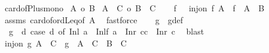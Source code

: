 \begin{isabellebody}
\ card{\isacharunderscore}{\kern0pt}of{\isacharunderscore}{\kern0pt}Plus{\isacharunderscore}{\kern0pt}mono{}{\isacharcolon}{\kern0pt}\isanewline
{}\ {\isachardoublequoteopen}{\isacharbar}{\kern0pt}A{\isacharbar}{\kern0pt}\ {\isasymle}o\ {\isacharbar}{\kern0pt}B{\isacharbar}{\kern0pt}{\isachardoublequoteclose}\isanewline
{}\ {\isachardoublequoteopen}{\isacharbar}{\kern0pt}A\ {\isacharless}{\kern0pt}{\isacharplus}{\kern0pt}{\isachargreater}{\kern0pt}\ C{\isacharbar}{\kern0pt}\ {\isasymle}o\ {\isacharbar}{\kern0pt}B\ {\isacharless}{\kern0pt}{\isacharplus}{\kern0pt}{\isachargreater}{\kern0pt}\ C{\isacharbar}{\kern0pt}{\isachardoublequoteclose}\isanewline
%
\isadelimproof
%
\endisadelimproof
%
\isatagproof
{}\isamarkupfalse%
{\isacharminus}{\kern0pt}\isanewline
\ \ \isamarkupfalse%
\ f\ \ {}{\isacharcolon}{\kern0pt}\ {\isachardoublequoteopen}inj{\isacharunderscore}{\kern0pt}on\ f\ A\ {\isasymand}\ f\ {\isacharbackquote}{\kern0pt}\ A\ {\isasymle}\ B{\isachardoublequoteclose}\isanewline
\ \ \isamarkupfalse%
\ assms\ card{\isacharunderscore}{\kern0pt}of{\isacharunderscore}{\kern0pt}ordLeq{\isacharbrackleft}{\kern0pt}of\ A{\isacharbrackright}{\kern0pt}\ \isamarkupfalse%
\ fastforce\isanewline
\ \ \isamarkupfalse%
\ g\ \ g{\isacharunderscore}{\kern0pt}def{\isacharcolon}{\kern0pt}\isanewline
\ \ {\isachardoublequoteopen}g\ {\isacharequal}{\kern0pt}\ {\isacharparenleft}{\kern0pt}{\isasymlambda}d{\isachardot}{\kern0pt}\ case\ d\ of\ Inl\ a\ {\isasymRightarrow}\ Inl{\isacharparenleft}{\kern0pt}f\ a{\isacharparenright}{\kern0pt}\ {\isacharbar}{\kern0pt}\ Inr\ {\isacharparenleft}{\kern0pt}c{\isacharcolon}{\kern0pt}{\isacharcolon}{\kern0pt}{\isacharprime}{\kern0pt}c{\isacharparenright}{\kern0pt}\ {\isasymRightarrow}\ Inr\ c{\isacharparenright}{\kern0pt}{\isachardoublequoteclose}\ \isamarkupfalse%
\ blast\isanewline
\ \ \isamarkupfalse%
\ {\isachardoublequoteopen}inj{\isacharunderscore}{\kern0pt}on\ g\ {\isacharparenleft}{\kern0pt}A\ {\isacharless}{\kern0pt}{\isacharplus}{\kern0pt}{\isachargreater}{\kern0pt}\ C{\isacharparenright}{\kern0pt}\ {\isasymand}\ g\ {\isacharbackquote}{\kern0pt}\ {\isacharparenleft}{\kern0pt}A\ {\isacharless}{\kern0pt}{\isacharplus}{\kern0pt}{\isachargreater}{\kern0pt}\ C{\isacharparenright}{\kern0pt}\ {\isasymle}\ {\isacharparenleft}{\kern0pt}B\ {\isacharless}{\kern0pt}{\isacharplus}{\kern0pt}{\isachargreater}{\kern0pt}\ C{\isacharparenright}{\kern0pt}{\isachardoublequoteclose}\isanewline

\end{isabellebody}
